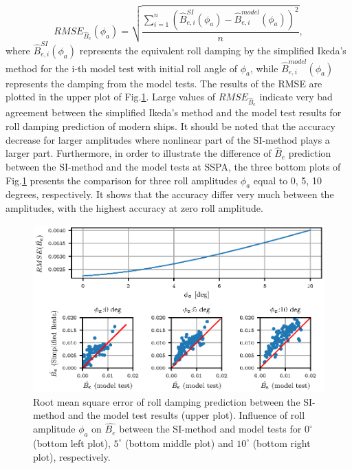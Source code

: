 \begin{equation} \label{eq:rmse}
    RMSE_{\hat{B}_e} (\phi_a) = \sqrt{\frac{\sum\limits_{i=1}^n (\hat{B}_{e,i}^{SI} (\phi_a) - \hat{B}_{e,i}^{model} (\phi_a))^2}{n}},
\end{equation}
where $\hat{B}_{e,i}^{SI} (\phi_a)$ represents the equivalent roll damping by the simplified Ikeda's method for the i-th model test with initial roll angle of $\phi_a$, while $\hat{B}_{e,i}^{model} (\phi_a)$ represents the damping from the model tests. The results of the RMSE are plotted in the upper plot of Fig.\ref{fig:ikeda_phi_a}. Large values of $RMSE_{\hat{B}_e}$ indicate very bad agreement between the simplified Ikeda's method and the model test results for roll damping prediction of modern ships. It should be noted that the accuracy decrease for larger amplitudes where nonlinear part of the SI-method plays a larger part. Furthermore, in order to illustrate the difference of $\hat{B}_e$ prediction between the SI-method and the model tests at SSPA, the three bottom plots of Fig.\ref{fig:ikeda_phi_a} presents the comparison for three roll amplitudes $\phi_a$ equal to 0, 5, 10 degrees, respectively. It shows that the accuracy differ very much between the amplitudes, with the highest accuracy at zero roll amplitude. 


\begin{figure}[H]
\centering
  \centering
  \includegraphics[]{figures/ikeda_phi_a.eps}
  \vspace{-0.5cm}
  \caption{Root mean square error of roll damping prediction between the SI-method and the model test results (upper plot). Influence of roll amplitude $\phi_a$ on $\hat{B_e}$ between the SI-method and model tests for $0^{\circ}$ (bottom left plot), $5^{\circ}$ (bottom middle plot) and $10^{\circ}$ (bottom right plot), respectively.}
  \label{fig:ikeda_phi_a}
\end{figure}

